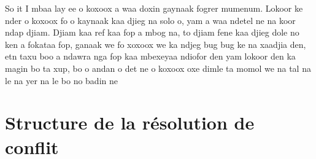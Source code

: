 \begin{paracol}{2}
  \switchcolumn %

  So it I mbaa lay ee o koxoox a waa doxin gaynaak fogrer mumenum.
  Lokoor ke nder o koxoox fo o kaynaak kaa djieg na solo o, yam a waa ndetel ne na koor ndap djiam.
  Djiam kaa ref kaa fop a mbog na, to djiam fene kaa djieg dole no ken a fokataa fop, ganaak we fo xoxoox we ka ndjeg bug bug ke na xaadjia den, etn taxu boo a ndawra nga fop kaa mbexeyaa ndiofor den yam lokoor den ka magin bo ta xup, bo o andan o det ne o koxoox oxe dimle ta momol we na tal na le na yer na le bo no badin ne

\end{paracol}


\section{Structure de la résolution de conflit}

